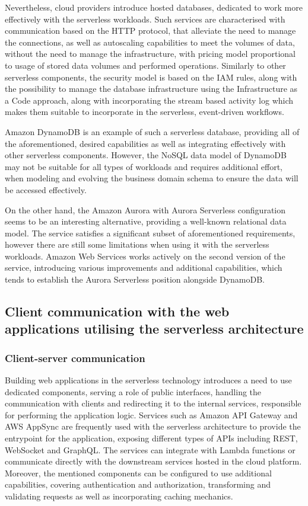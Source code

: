 Nevertheless, cloud providers introduce hosted databases, dedicated to work more effectively with the serverless workloads.
Such services are characterised with communication based on the HTTP protocol, that alleviate the need to manage the connections, as well as autoscaling capabilities to meet the volumes of data, without the need to manage the infrastructure, with pricing model proportional to usage of stored data volumes and performed operations.
Similarly to other serverless components, the security model is based on the IAM rules, along with the possibility to manage the database infrastructure using the Infrastructure as a Code approach, along with incorporating the stream based activity log which makes them suitable to incorporate in the serverless, event-driven workflows.

Amazon DynamoDB is an example of such a serverless database, providing all of the aforementioned, desired capabilities as well as integrating effectively with other serverless components.
However, the NoSQL data model of DynamoDB may not be suitable for all types of workloads and requires additional effort, when modeling and evolving the business domain schema to ensure the data will be accessed effectively.

On the other hand, the Amazon Aurora with Aurora Serverless configuration seems to be an interesting alternative, providing a well-known relational data model.
The service satisfies a significant subset of aforementioned requirements, however there are still some limitations when using it with the serverless workloads.
Amazon Web Services works actively on the second version of the service, introducing various improvements and additional capabilities, which tends to establish the Aurora Serverless position alongside DynamoDB.

\subsection{Client communication with the web applications utilising the serverless architecture}

\subsubsection{Client-server communication}

Building web applications in the serverless technology introduces a need to use dedicated components, serving a role of public interfaces, handling the communication with clients and redirecting it to the internal services, responsible for performing the application logic.
Services such as Amazon API Gateway and AWS AppSync are frequently used with the serverless architecture to provide the entrypoint for the application, exposing different types of APIs including REST, WebSocket and GraphQL.
The services can integrate with Lambda functions or communicate directly with the downstream services hosted in the cloud platform. 
Moreover, the mentioned components can be configured to use additional capabilities, covering authentication and authorization, transforming and validating requests as well as incorporating caching mechanics.

